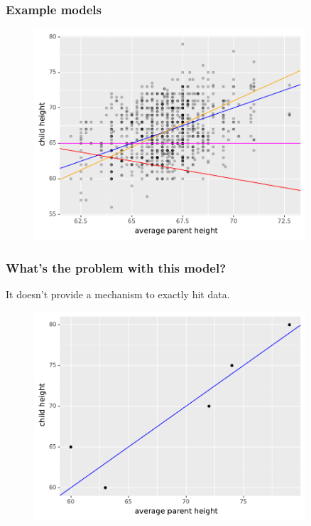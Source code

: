 \documentclass[handout]{beamer}
\begin{document}
\begin{frame}
	\frametitle{Example models}
	
	\begin{figure}[ht]
		\centerline{\includegraphics[width=0.9\textwidth]{../figures/galton_example_lines.pdf}}
	\end{figure}
	
\end{frame}

\begin{frame}
	\frametitle{What's the problem with this model?}
	
	It doesn't provide a mechanism to exactly hit data.
	
	\begin{figure}[ht]
		\centerline{\includegraphics[width=0.9\textwidth]{../figures/galton_model_without_residuals.pdf}}
	\end{figure}
	
\end{frame}
\end{document}
